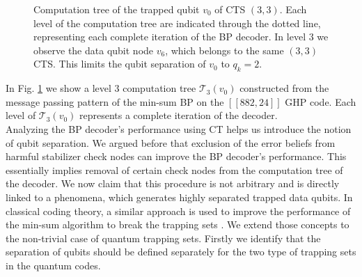 \documentclass[%
 reprint,
 amsmath,amssymb,
 aps,
pra,
showkeys,
]{revtex4-2}
\begin{document}
\begin{figure}[t]

\caption{Computation tree of the trapped qubit $v_0$ of CTS $(3,3)$.
Each level of the computation tree are indicated through the dotted line, representing each complete iteration of the BP decoder.
In level $3$ we observe the data qubit node $v_6$, which belongs to the same $(3,3)$ CTS.
This limits the qubit separation of $v_0$ to $q_k = 2$.
}
\label{fig:computation-tree-3-3}
\end{figure}
In Fig. \ref{fig:computation-tree-3-3} we show a level $3$ computation tree $\mathcal{T}_3(v_0)$ constructed from the message passing pattern of the min-sum BP on the $[[882,24]]$ GHP code.
Each level of $\mathcal{T}_3(v_0)$ represents a  complete iteration of the decoder.
\\
Analyzing the BP decoder's performance using CT helps us introduce the notion of qubit separation.
We argued before that exclusion of the error beliefs from harmful stabilizer check nodes can improve the BP decoder's performance.
This essentially implies removal of certain check nodes from the computation tree of the decoder.
We now claim that this procedure is not arbitrary and is directly linked to a phenomena, which generates highly separated trapped data qubits.
In classical coding theory, a similar approach is used to improve the performance of the min-sum algorithm to break the trapping sets \cite{kang2015breaking}.
We extend those concepts to the non-trivial case of quantum trapping sets.
Firstly we identify that the separation of qubits should be defined separately for the two type of trapping sets in the quantum codes.
\end{document}
